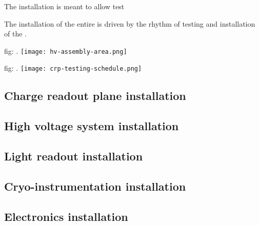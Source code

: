 The  installation is meant to allow test

The installation of the entire  is driven by the rhythm of testing and installation of the .


\begin{dunefigure}[]{fig:}
{.}
\texttt{[image: hv-assembly-area.png]}
\end{dunefigure}

\begin{dunefigure}[]{fig:}
{.}
\texttt{[image: crp-testing-schedule.png]}
\end{dunefigure}

\subsection{Charge readout plane installation}
\subsection{High voltage system installation}
\subsection{Light readout installation}
\subsection{Cryo-instrumentation installation}
\subsection{Electronics installation}
